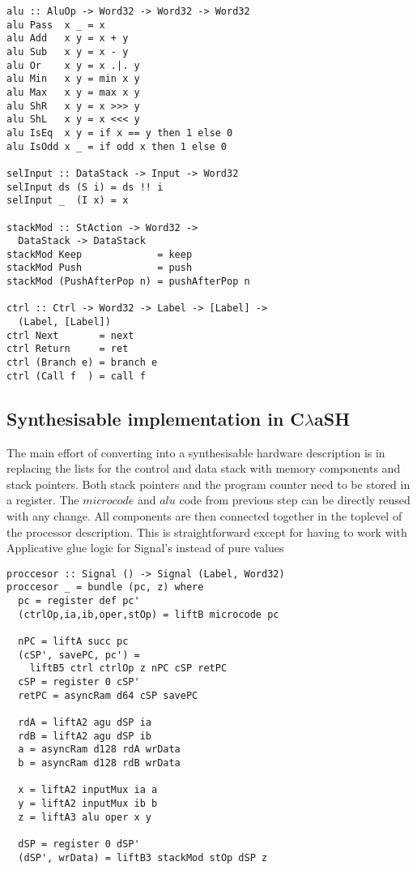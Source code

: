 \documentclass[preprint]{sigplanconf}
\def\clash{C$\lambda$aSH\xspace}
\begin{document}
\begin{lstlisting}
alu :: AluOp -> Word32 -> Word32 -> Word32
alu Pass  x _ = x
alu Add   x y = x + y
alu Sub   x y = x - y
alu Or    x y = x .|. y
alu Min   x y = min x y
alu Max   x y = max x y
alu ShR   x y = x >>> y
alu ShL   x y = x <<< y
alu IsEq  x y = if x == y then 1 else 0
alu IsOdd x _ = if odd x then 1 else 0

selInput :: DataStack -> Input -> Word32
selInput ds (S i) = ds !! i
selInput _  (I x) = x

stackMod :: StAction -> Word32 -> 
  DataStack -> DataStack
stackMod Keep             = keep
stackMod Push             = push
stackMod (PushAfterPop n) = pushAfterPop n

ctrl :: Ctrl -> Word32 -> Label -> [Label] ->
  (Label, [Label])
ctrl Next       = next
ctrl Return     = ret
ctrl (Branch e) = branch e
ctrl (Call f  ) = call f
\end{lstlisting}

\subsection{Synthesisable implementation in \clash}
The main effort of converting into a synthesisable hardware description is in replacing the lists for the control and data stack with memory components and stack pointers.
Both stack pointers and the program counter need to be stored in a register.
The $microcode$ and $alu$ code from previous step can be directly reused with any change.
All components are then connected together in the toplevel of the processor description.
This is straightforward except for having to work with Applicative glue logic for Signal's instead of pure values

\begin{lstlisting}
proccesor :: Signal () -> Signal (Label, Word32)
proccesor _ = bundle (pc, z) where
  pc = register def pc'
  (ctrlOp,ia,ib,oper,stOp) = liftB microcode pc

  nPC = liftA succ pc
  (cSP', savePC, pc') = 
    liftB5 ctrl ctrlOp z nPC cSP retPC
  cSP = register 0 cSP'
  retPC = asyncRam d64 cSP savePC

  rdA = liftA2 agu dSP ia
  rdB = liftA2 agu dSP ib
  a = asyncRam d128 rdA wrData
  b = asyncRam d128 rdB wrData

  x = liftA2 inputMux ia a
  y = liftA2 inputMux ib b
  z = liftA3 alu oper x y

  dSP = register 0 dSP'
  (dSP', wrData) = liftB3 stackMod stOp dSP z
\end{lstlisting}
\end{document}
